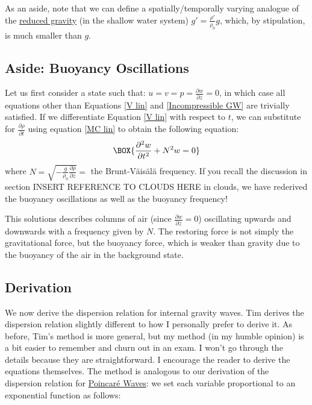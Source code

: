 As an aside, note that we can define a spatially/temporally varying analogue of the \hyperref[RG Box]{reduced gravity} (in the shallow water system) \(g'=\frac{\rho'}{\rho_0}g\), which, by stipulation, is much smaller than \(g\).

\subsection{Aside: Buoyancy Oscillations}

Let us first consider a state such that: \(u=v=p=\frac{\partial w}{\partial z}=0\), in which case all equations other than Equations \ref{V lin} and \ref{Incompressible GW} are trivially satisfied. If we differentiate Equation \ref{V lin} with respect to \(t\), we can substitute for \(\frac{\partial \rho}{\partial t}\) using equation \ref{MC lin} to obtain the following equation:
\begin{align}
    \BOX{\frac{\partial^2 w}{\partial t^2}+N^2 w = 0}
\end{align}
where \(N = \sqrt{-\frac{g}{\rho_0}\frac{\partial \bar{\rho}}{\partial z}}=\) the Brunt-Väisälä frequency. If you recall the discussion in section INSERT REFERENCE TO CLOUDS HERE in clouds, we have rederived the buoyancy oscillations as well as the buoyancy frequency!

This solutions describes columns of air (since \(\frac{\partial w}{\partial z}=0\)) oscillating upwards and downwards with a frequency given by \(N\). The restoring force is not simply the gravitational force, but the buoyancy force, which is weaker than gravity due to the buoyancy of the air in the background state.

\subsection{Derivation}

We now derive the dispersion relation for internal gravity waves. Tim derives the dispersion relation slightly different to how I personally prefer to derive it. As before, Tim's method is more general, but my method (in my humble opinion) is a bit easier to remember and churn out in an exam. I won't go through the details because they are straightforward. I encourage the reader to derive the equations themselves. The method is analogous to our derivation of the dispersion relation for \hyperref[2D Poincare]{Poincaré Waves}: we set each variable proportional to an exponential function as follows:

